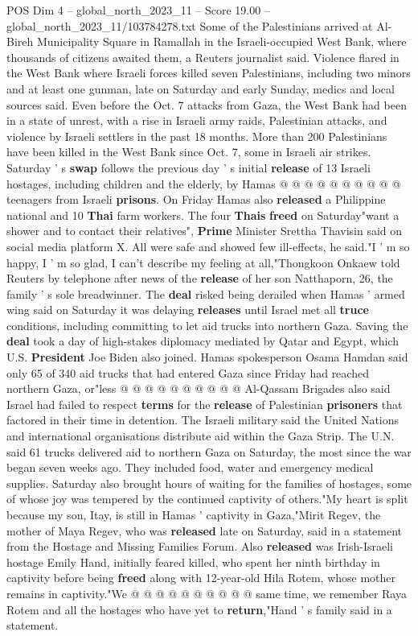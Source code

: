 \begin{textsample}{POS Dim 4 – global\_north\_2023\_11 – Score 19.00 – global\_north\_2023\_11/103784278.txt}
Some of the Palestinians arrived at Al-Bireh Municipality Square in Ramallah in the Israeli-occupied West Bank, where thousands of citizens awaited them, a Reuters journalist said.
Violence flared in the West Bank where Israeli forces killed seven Palestinians, including two minors and at least one gunman, late on Saturday and early Sunday, medics and local sources said.
Even before the Oct. 7 attacks from Gaza, the West Bank had been in a state of unrest, with a rise in Israeli army raids, Palestinian attacks, and violence by Israeli settlers in the past 18 months.
More than 200 Palestinians have been killed in the West Bank since Oct. 7, some in Israeli air strikes.
Saturday ' s \textbf{swap} follows the previous day ' s initial \textbf{release} of 13 Israeli hostages, including children and the elderly, by Hamas @ @ @ @ @ @ @ @ @ @ teenagers from Israeli \textbf{prisons}.
On Friday Hamas also \textbf{released} a Philippine national and 10 \textbf{Thai} farm workers.
The four \textbf{Thais} \textbf{freed} on Saturday"want a shower and to contact their relatives", \textbf{Prime} Minister Srettha Thavisin said on social media platform X.
All were safe and showed few ill-effects, he said."I ' m so happy, I ' m so glad, I can't describe my feeling at all,"Thongkoon Onkaew told Reuters by telephone after news of the \textbf{release} of her son Natthaporn, 26, the family ' s sole breadwinner.
The \textbf{deal} risked being derailed when Hamas ' armed wing said on Saturday it was delaying \textbf{releases} until Israel met all \textbf{truce} conditions, including committing to let aid trucks into northern Gaza.
Saving the \textbf{deal} took a day of high-stakes diplomacy mediated by Qatar and Egypt, which U.S. \textbf{President} Joe Biden also joined.
Hamas spokesperson Osama Hamdan said only 65 of 340 aid trucks that had entered Gaza since Friday had reached northern Gaza, or"less @ @ @ @ @ @ @ @ @ @ Al-Qassam Brigades also said Israel had failed to respect \textbf{terms} for the \textbf{release} of Palestinian \textbf{prisoners} that factored in their time in detention.
The Israeli military said the United Nations and international organisations distribute aid within the Gaza Strip.
The U.N. said 61 trucks delivered aid to northern Gaza on Saturday, the most since the war began seven weeks ago.
They included food, water and emergency medical supplies.
Saturday also brought hours of waiting for the families of hostages, some of whose joy was tempered by the continued captivity of others."My heart is split because my son, Itay, is still in Hamas ' captivity in Gaza,"Mirit Regev, the mother of Maya Regev, who was \textbf{released} late on Saturday, said in a statement from the Hostage and Missing Families Forum.
Also \textbf{released} was Irish-Israeli hostage Emily Hand, initially feared killed, who spent her ninth birthday in captivity before being \textbf{freed} along with 12-year-old Hila Rotem, whose mother remains in captivity."We @ @ @ @ @ @ @ @ @ @ same time, we remember Raya Rotem and all the hostages who have yet to \textbf{return},"Hand ' s family said in a statement.


\end{textsample}

